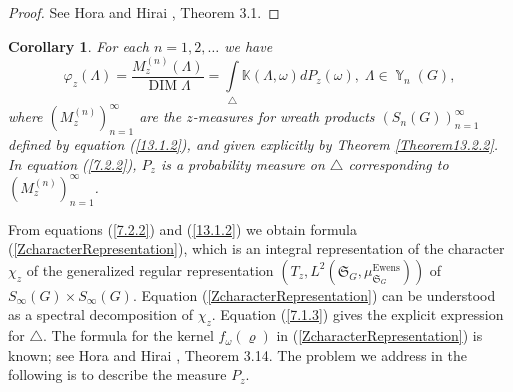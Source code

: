 \documentclass[12pt]{amsart}
\newtheorem{cor}[thm]{Corollary}
\theoremstyle{definition}
\numberwithin{equation}{section}
\DeclareMathOperator{\Y}{\mathbb{Y}}
\DeclareMathOperator{\DIM}{DIM}
\DeclareMathOperator{\Ewens}{Ewens}
\begin{document}
\begin{proof}See Hora and Hirai \cite{HoraHirai}, Theorem 3.1.
\end{proof}
\begin{cor}For each $n=1,2,\ldots $ we have
\begin{equation}\label{7.2.2}
\varphi_z(\Lambda)=\frac{M_z^{(n)}(\Lambda)}{\DIM\Lambda}
=\int\limits_{\triangle}\mathbb{K}(\Lambda,\omega)dP_{z}(\omega), \;\Lambda\in\Y_n(G),
\end{equation}
where $\left(M_z^{(n)}\right)_{n=1}^{\infty}$ are the $z$-measures for wreath products $\left(S_n\left(G\right)\right)_{n=1}^{\infty}$
defined by equation (\ref{13.1.2}), and given explicitly by Theorem \ref{Theorem13.2.2}.
In equation (\ref{7.2.2}), $P_z$ is a probability measure on $\triangle$ corresponding to $\left(M_z^{(n)}\right)_{n=1}^{\infty}$.
\end{cor}
From equations (\ref{7.2.2}) and (\ref{13.1.2}) we obtain formula
(\ref{ZcharacterRepresentation}), which is an integral representation of the character
$\chi_z$ of the generalized regular representation $\left(T_z,L^2\left(\mathfrak{S}_G,
\mu_{\mathfrak{S}_G}^{\Ewens}\right)\right)$ of $S_{\infty}(G)\times S_{\infty}(G)$.
Equation (\ref{ZcharacterRepresentation}) can be understood as a spectral decomposition
of $\chi_z$.
Equation (\ref{7.1.3}) gives the explicit expression for $\triangle$. The formula for the kernel
$f_{\omega}(\varrho)$ in (\ref{ZcharacterRepresentation}) is known;
see Hora and Hirai \cite{HoraHirai}, Theorem 3.14. The problem we address in the following is to describe the measure $P_z$.
\end{document}
